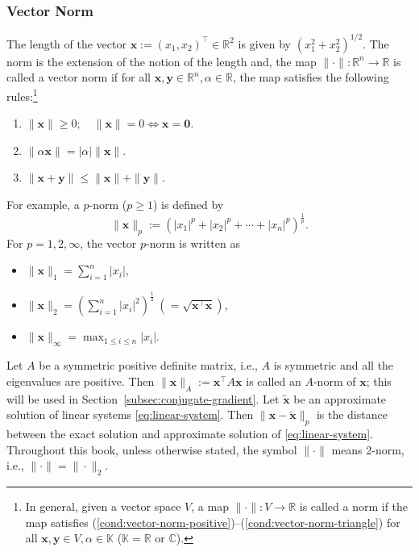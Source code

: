 \subsubsection{{Vector Norm}}\label{subsec:vector-norm}
{The length of the vector $\bm x:=(x_1,x_2)^\top\in\mathbb R^2$ is given by $(x_1^2+x_2^2)^{1/2}$. The norm is the extension of the notion of the length and, the map $\|\cdot\|:\mathbb R^n\to\mathbb R$ is called a vector norm if for all $\bm x,\bm y\in\mathbb R^n,\alpha\in\mathbb R$, the map satisfies the following rules:\footnote{In general, given a vector space $V$, a map $\|\cdot\|:V\to\mathbb R$ is called a norm if the map satisfies (\ref{cond:vector-norm-positive})--(\ref{cond:vector-norm-triangle}) for all $\bm x,\bm y\in V,\alpha\in\mathbb K$ ($\mathbb K=\mathbb R$ or $\mathbb C$).}}
\begin{enumerate}[label=(Nv\arabic*),ref=Nv\arabic*]
\item\label{cond:vector-norm-positive} $\|\bm x\|\ge0;\quad\|\bm x\|=0\iff\bm x=\bm0$.
\item\label{cond:vector-norm-homogeneous} $\|\alpha\bm x\|=|\alpha|\|\bm x\|$.
\item\label{cond:vector-norm-triangle} $\|\bm x+\bm y\|\le\|\bm x\|+\|\bm y\|$.
\end{enumerate}
{For example, a $p$-norm ($p\ge1$) is defined by}
\[
\|\bm x\|_p:=(|x_1|^p+|x_2|^p+\cdots+|x_n|^p)^{\frac1p}.
\]
{For $p=1,2,\infty$, the vector $p$-norm is written as}
\begin{itemize}
\item $\|\bm x\|_1=\sum_{i=1}^n|x_i|$,
\item $\|\bm x\|_2=(\sum_{i=1}^n|x_i|^2)^{\frac12}\ (=\sqrt{\bm x^\top\bm x})$,
\item $\|\bm x\|_\infty=\max_{1\le i\le n}|x_i|$.
\end{itemize}
{Let $A$ be a symmetric positive definite matrix, i.e., $A$ is symmetric and all the eigenvalues are positive. Then $\|\bm x\|_A:=\bm x^\top A\bm x$ is called an $A$-norm of $\bm x$; this will be used in Section~\ref{subsec:conjugate-gradient}.}
{Let $\tilde{\bm x}$ be an approximate solution of linear systems \eqref{eq:linear-system}. Then $\|\bm x-\tilde{\bm x}\|_p$ is the distance between the exact solution and approximate solution of \eqref{eq:linear-system}.}
{Throughout this book, unless otherwise stated, the symbol $\|\cdot\|$ means 2-norm, i.e., $\|\cdot\|=\|\cdot\|_2$.}
